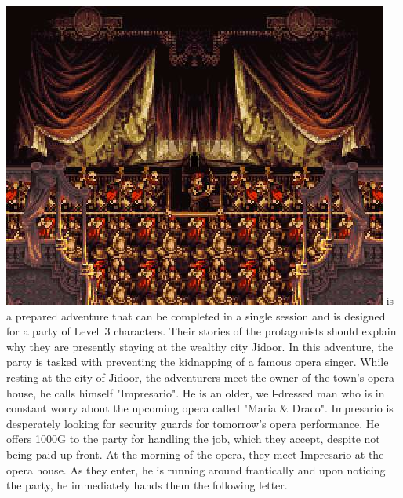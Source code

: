 %
%
\vfill
%
\includegraphics[width=\columnwidth]{./art/mariaanddraco/opera.jpg}
%
\vfill
%
 is a prepared adventure that can be completed in a single session and is designed for a party of Level~3 characters.
Their stories of the protagonists should explain why they are presently staying at the wealthy city Jidoor.
In this adventure, the party is tasked with preventing the kidnapping of a famous opera singer.
%
\vfill
%
%
\vfill
%
While resting at the city of Jidoor, the adventurers meet the owner of the town's opera house, he calls himself "Impresario".
He is an older, well-dressed man who is in constant worry about the upcoming opera called "Maria \& Draco".
Impresario is desperately looking for security guards for tomorrow's opera performance.
He offers 1000G to the party for handling the job, which they accept, despite not being paid up front.
At the morning of the opera, they meet Impresario at the opera house.
As they enter, he is running around frantically and upon noticing the party, he immediately hands them the following letter.\\
